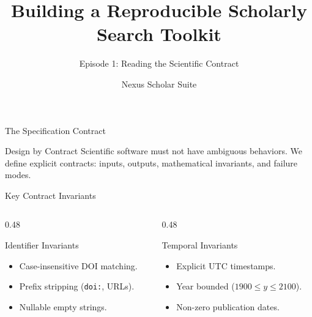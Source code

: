 \documentclass[aspectratio=169]{beamer}
\title{Building a Reproducible Scholarly Search Toolkit}
\subtitle{Episode 1: Reading the Scientific Contract}
\author{Nexus Scholar Suite}
\date{}
\begin{document}
\begin{frame}[plain]
  \titlepage
\end{frame}

\begin{frame}{The Specification Contract}
  \begin{alertblock}{Design by Contract}
    Scientific software must not have ambiguous behaviors. We define explicit contracts: inputs, outputs, mathematical invariants, and failure modes.
  \end{alertblock}
  \vspace{0.4cm}
  \begin{center}
  \end{center}
\end{frame}

\begin{frame}{Key Contract Invariants}
  \begin{columns}[T]
    \begin{column}{0.48\textwidth}
      \begin{block}{Identifier Invariants}
        \begin{itemize}
          \item Case-insensitive DOI matching.
          \item Prefix stripping (\texttt{doi:}, URLs).
          \item Nullable empty strings.
        \end{itemize}
      \end{block}
    \end{column}
    \begin{column}{0.48\textwidth}
      \begin{block}{Temporal Invariants}
        \begin{itemize}
          \item Explicit UTC timestamps.
          \item Year bounded ($1900 \le y \le 2100$).
          \item Non-zero publication dates.
        \end{itemize}
      \end{block}
    \end{column}
  \end{columns}
\end{frame}
\end{document}
